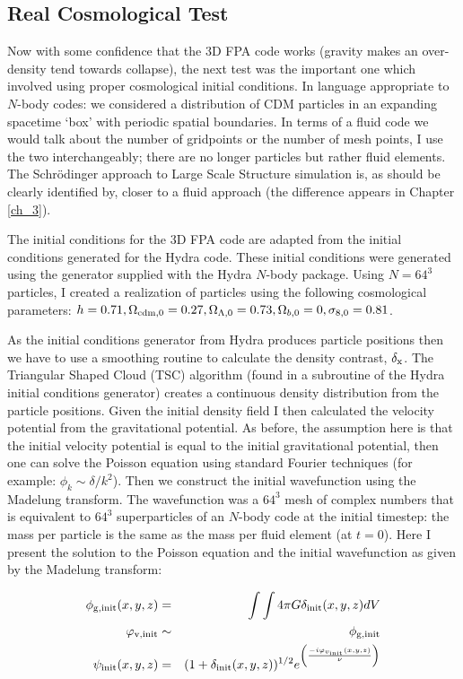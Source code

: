 \subsection{Real Cosmological Test}
\label{rct}
Now with some confidence that the 3D FPA code works (gravity makes an over-density tend towards collapse), the next test was the important one which involved using proper cosmological initial conditions. In language appropriate to $N$-body codes: we considered a distribution of CDM particles in an expanding spacetime `box' with periodic spatial boundaries. In terms of a fluid code we would talk about the number of gridpoints or the number of mesh points, I use the two interchangeably; there are no longer particles but rather fluid elements. The Schr\"odinger approach to Large Scale Structure simulation is, as should be clearly identified by, closer to a fluid approach (the difference appears in Chapter \ref{ch_3}).

The initial conditions for the 3D FPA code are adapted from the initial conditions generated for the Hydra code. These initial conditions were generated using the generator supplied with the Hydra $N$-body package. Using $N = 64^3$ particles, I created a realization of particles using the following cosmological parameters: $h= 0.71, \Omega_{\rm cdm,0}=0.27, \Omega_{\Lambda,0}=0.73,\Omega_{b,0} =0, \sigma_{8,0}=0.81$.

As the initial conditions generator from Hydra produces particle positions then we have to use a smoothing routine to calculate the density contrast, $\delta_{\rm x}$. The Triangular Shaped Cloud (TSC) algorithm (found in a subroutine of the Hydra initial conditions generator) creates a continuous density distribution from the particle positions. Given the initial density field I then calculated the velocity potential from the gravitational potential. As before, the assumption here is that the initial velocity potential is equal to the initial gravitational potential, then one can solve the Poisson equation using standard Fourier techniques (for example: $\phi_k \sim \delta / k^2$). Then we construct the initial wavefunction using the Madelung transform. The wavefunction was a $64^3$ mesh of complex numbers that is equivalent to $64^3$ superparticles of an $N$-body code at the initial timestep: the mass per particle is the same as the mass per fluid element (at $t=0$). Here I present the solution to the Poisson equation and the initial wavefunction as given by the Madelung transform:

\begin{eqnarray}
	\phi_{\rm g,init}(x,y,z) &=& \int\int 4 \pi G \delta_{\rm init}(x,y,z) dV \nonumber \\
	\varphi_{\rm v,init} &\sim& \phi_{\rm g,init} \nonumber \\
	\psi_{\rm init}(x,y,z) &=& (1+\delta_{\rm init}(x,y,z))^{1/2}e^{\left(\frac{-i\varphi_{v_{\rm init}}(x,y,z)}{\nu}\right)}
\end{eqnarray}


